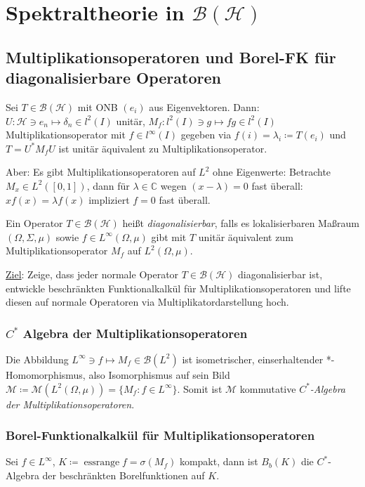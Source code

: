 \documentclass[11pt,a4paper]{scrartcl}
\newcommand{\C}{\mathbb{C}} %
\newcommand{\Hc}{\mathcal{H}}
\newcommand{\B}{\mathcal{B}}
\newcommand{\M}{\mathcal{M}}
\theoremstyle{plain}
\theoremstyle{definition}
\theoremstyle{remark}
\DeclareMathOperator{\essrange}{ess range}
\begin{document}
\section{Spektraltheorie in $\B(\Hc)$}

\subsection{Multiplikationsoperatoren und Borel-FK für diagonalisierbare Operatoren}

Sei $T\in \B(\Hc)$ mit ONB $(e_i)$ aus Eigenvektoren. Dann: $U: \Hc \ni e_n \mapsto \delta_n \in l^2(I)$ unitär, $M_f: l^2(I) \ni g \mapsto fg \in l^2(I)$ Multiplikationsoperator mit $f\in l^\infty(I)$ gegeben via $f(i)=\lambda_i\coloneqq T(e_i)$ und $T=U^*M_f U$ ist unitär äquivalent zu Multiplikationsoperator.

Aber: Es gibt Multiplikationsoperatoren auf $L^2$ ohne Eigenwerte: Betrachte $M_x \in L^2([0,1])$, dann für $\lambda\in\C$ wegen $(x-\lambda)=0$ fast überall: $x f(x) = \lambda f(x)$ impliziert $f=0$ fast überall.

Ein Operator $T\in \B(\Hc)$ heißt \emph{diagonalisierbar}, falls es lokalisierbaren Maßraum $(\Omega, \Sigma, \mu)$ sowie $f\in L^\infty(\Omega, \mu)$ gibt mit $T$ unitär äquivalent zum Multiplikationsoperator $M_f$ auf $L^2(\Omega, \mu)$.

\underline{Ziel}: Zeige, dass jeder normale Operator $T\in \B(\Hc)$ diagonalisierbar ist, entwickle beschränkten Funktionalkalkül für Multiplikationsoperatoren und lifte diesen auf normale Operatoren via Multiplikatordarstellung hoch.

\subsubsection{$C^*$ Algebra der Multiplikationsoperatoren}

Die Abbildung $L^\infty \ni f \mapsto M_f \in \B(L^2)$ ist isometrischer, einserhaltender *-Homomorphismus, also Isomorphismus auf sein Bild $\M\coloneqq \M(L^2(\Omega,\mu))=\{ M_f: f\in L^\infty \}$. Somit ist $\M$ kommutative \emph{$C^*$-Algebra der Multiplikationsoperatoren}.

\subsubsection{Borel-Funktionalkalkül für Multiplikationsoperatoren}

Sei $f\in L^\infty$, $K\coloneqq \essrange f = \sigma(M_f)$ kompakt, dann ist $B_b(K)$ die $C^*$-Algebra der beschränkten Borelfunktionen auf $K$. 
\end{document}

